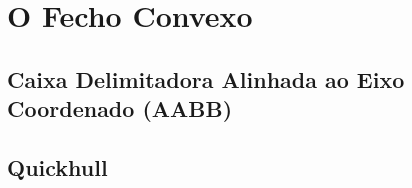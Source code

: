 \chapter{O Fecho Convexo}

\section{Caixa Delimitadora Alinhada ao Eixo Coordenado (AABB)}

\section{Quickhull}
